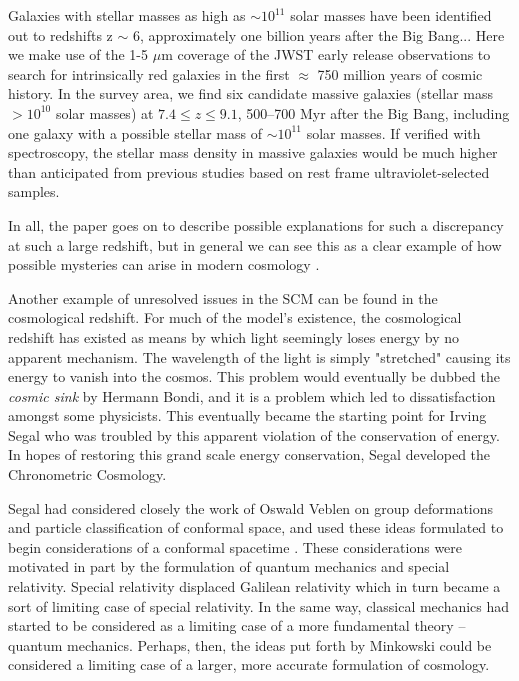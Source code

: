 \documentclass[a4paper]{article}
\begin{document}
    \begin{displayquote}
        Galaxies with stellar masses as high as $\sim 10^{11}$ solar masses
        have been identified out to redshifts z $\sim$ 6, approximately one
        billion years after the Big Bang... Here we make use of the 1-5 $\mu$m
        coverage of the JWST early release observations to search for 
        intrinsically red galaxies in the first $\approx$ 750 million years of cosmic
        history. In the survey area, we find six candidate massive galaxies
        (stellar mass $> 10^{10}$ solar masses) at $7.4 \le z \le 9.1$, 500–700 Myr
        after the Big Bang, including one galaxy with a possible stellar mass
        of $\sim 10^{11}$  solar masses. If verified with spectroscopy, the stellar
        mass density in massive  galaxies would be much higher than
        anticipated from previous studies based on rest frame
        ultraviolet-selected samples.
    \end{displayquote}

    In all, the paper goes on to describe possible explanations for such a
    discrepancy at such a large redshift, but in general we can see this as a
    clear example of how possible mysteries can arise in modern cosmology
    \cite{labbe}.

    Another example of unresolved issues in the SCM can be found in the
    cosmological redshift. For much of the model's existence, the cosmological
    redshift has existed as means by which light seemingly loses energy by no
    apparent mechanism. The wavelength of the light is simply "stretched"
    causing its energy to vanish into the cosmos. This problem would
    eventually be dubbed the \textit{cosmic sink} by Hermann Bondi, and it is a
    problem which led to dissatisfaction amongst some physicists. This
    eventually became the starting point for Irving Segal who was troubled by
    this apparent violation of the conservation of energy. In hopes of
    restoring this grand scale energy conservation, Segal developed the
    Chronometric Cosmology\footnotemark.

    Segal had considered closely the work of Oswald Veblen on group
    deformations and particle classification of conformal space, and used these
    ideas formulated to begin considerations of a conformal
    spacetime \cite{segal_b}. These considerations were motivated in part by
    the formulation of quantum mechanics and special relativity. Special
    relativity displaced Galilean relativity which in turn became a sort of
    limiting case of special relativity. In the same way, classical mechanics had
    started to be considered as a limiting case of a more fundamental theory --
    quantum mechanics. Perhaps, then, the ideas put forth by Minkowski could
    be considered a limiting case of a larger, more accurate formulation of
    cosmology.
\end{document}

